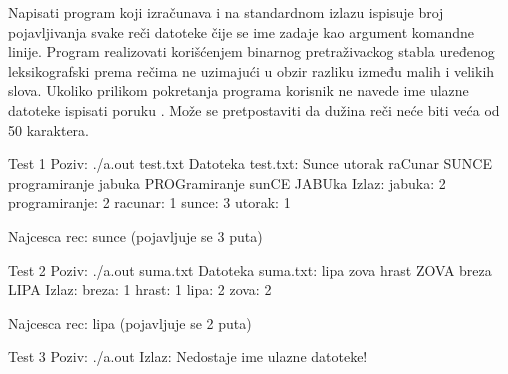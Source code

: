 \begin{Exercise}[label=702]
Napisati program koji izračunava i na standardnom izlazu ispisuje broj pojavljivanja svake reči datoteke čije se ime zadaje kao argument komandne linije. Program realizovati korišćenjem binarnog pretraživackog stabla uređenog leksikografski prema rečima ne uzimajući u obzir razliku između malih i velikih slova. Ukoliko prilikom pokretanja programa korisnik ne navede ime ulazne datoteke ispisati poruku . Može se pretpostaviti da dužina reči neće biti veća od 50 karaktera.

\begin{miditest}
\begin{test}{Test 1}
Poziv: ./a.out test.txt
Datoteka test.txt:
	Sunce utorak raCunar SUNCE programiranje jabuka PROGramiranje sunCE JABUka
Izlaz:
	jabuka: 2
	programiranje: 2
	racunar: 1
	sunce: 3
	utorak: 1

	Najcesca rec: sunce (pojavljuje se 3 puta)
\end{test}
\end{miditest}

\begin{miditest}
\begin{test}{Test 2}
Poziv: ./a.out suma.txt
Datoteka suma.txt:
	lipa zova hrast ZOVA breza LIPA
Izlaz:
	breza: 1
	hrast: 1
	lipa: 2
	zova: 2
	
	Najcesca rec: lipa (pojavljuje se 2 puta)
\end{test}
\end{miditest}

\begin{miditest}
\begin{test}{Test 3}
Poziv: ./a.out 
Izlaz:
	Nedostaje ime ulazne datoteke!
\end{test}
\end{miditest}


\end{Exercise}


\begin{Answer}[ref=702]
\end{Answer}


